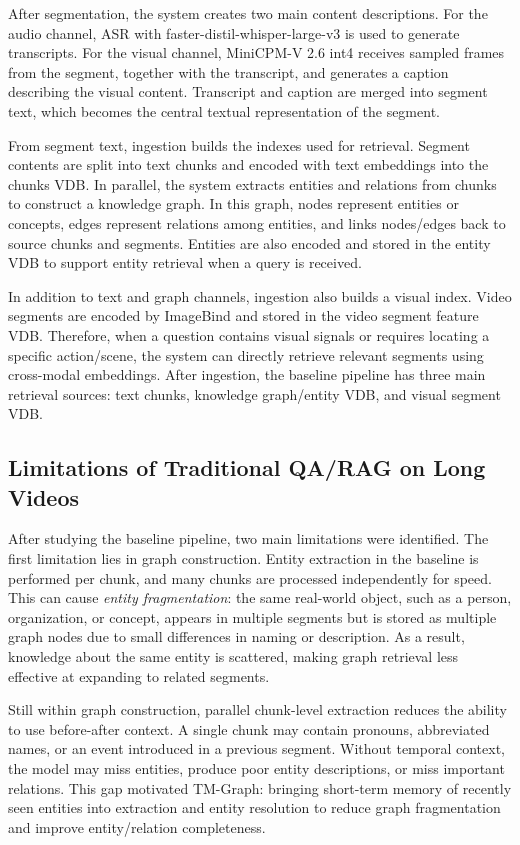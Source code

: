 \documentclass[12pt,a4paper]{article}
\newcommand{\codepath}[1]{\path{#1}}
\begin{document}
After segmentation, the system creates two main content descriptions. For the audio channel, ASR with faster-distil-whisper-large-v3 is used to generate transcripts. For the visual channel, MiniCPM-V 2.6 int4 receives sampled frames from the segment, together with the transcript, and generates a caption describing the visual content. Transcript and caption are merged into segment text, which becomes the central textual representation of the segment.

From segment text, ingestion builds the indexes used for retrieval. Segment contents are split into text chunks and encoded with text embeddings into the chunks VDB. In parallel, the system extracts entities and relations from chunks to construct a knowledge graph. In this graph, nodes represent entities or concepts, edges represent relations among entities, and \codepath{source_id} links nodes/edges back to source chunks and segments. Entities are also encoded and stored in the entity VDB to support entity retrieval when a query is received.

In addition to text and graph channels, ingestion also builds a visual index. Video segments are encoded by ImageBind and stored in the video segment feature VDB. Therefore, when a question contains visual signals or requires locating a specific action/scene, the system can directly retrieve relevant segments using cross-modal embeddings. After ingestion, the baseline pipeline has three main retrieval sources: text chunks, knowledge graph/entity VDB, and visual segment VDB.

\subsection{Limitations of Traditional QA/RAG on Long Videos}

After studying the baseline pipeline, two main limitations were identified. The first limitation lies in graph construction. Entity extraction in the baseline is performed per chunk, and many chunks are processed independently for speed. This can cause \textit{entity fragmentation}: the same real-world object, such as a person, organization, or concept, appears in multiple segments but is stored as multiple graph nodes due to small differences in naming or description. As a result, knowledge about the same entity is scattered, making graph retrieval less effective at expanding to related segments.

Still within graph construction, parallel chunk-level extraction reduces the ability to use before-after context. A single chunk may contain pronouns, abbreviated names, or an event introduced in a previous segment. Without temporal context, the model may miss entities, produce poor entity descriptions, or miss important relations. This gap motivated TM-Graph: bringing short-term memory of recently seen entities into extraction and entity resolution to reduce graph fragmentation and improve entity/relation completeness.
\end{document}
